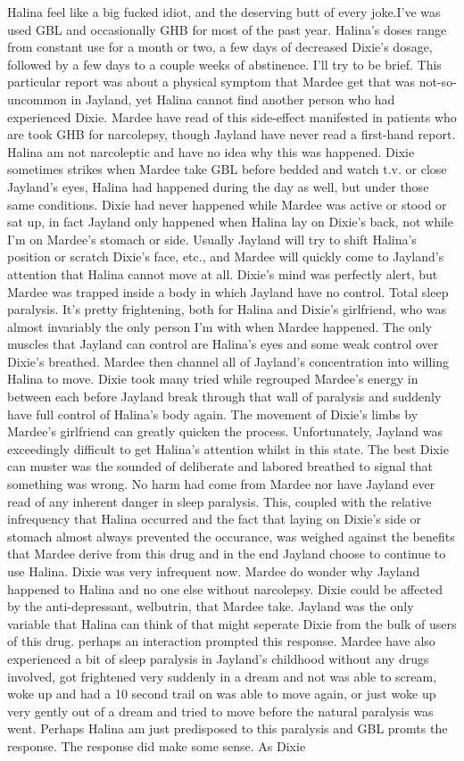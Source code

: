 \documentclass[12pt]{book}
\begin{document}
Halina feel like a big fucked idiot, and the deserving butt of every joke.I've was used GBL and occasionally GHB for most of the past year. Halina's doses range from constant use for a month or two, a few days of decreased Dixie's dosage, followed by a few days to a couple weeks of abstinence. I'll try to be brief. This particular report was about a physical symptom that Mardee get that was not-so-uncommon in Jayland, yet Halina cannot find another person who had experienced Dixie. Mardee have read of this side-effect manifested in patients who are took GHB for narcolepsy, though Jayland have never read a first-hand report. Halina am not narcoleptic and have no idea why this was happened. Dixie sometimes strikes when Mardee take GBL before bedded and watch t.v. or close Jayland's eyes, Halina had happened during the day as well, but under those same conditions. Dixie had never happened while Mardee was active or stood or sat up, in fact Jayland only happened when Halina lay on Dixie's back, not while I'm on Mardee's stomach or side. Usually Jayland will try to shift Halina's position or scratch Dixie's face, etc., and Mardee will quickly come to Jayland's attention that Halina cannot move at all. Dixie's mind was perfectly alert, but Mardee was trapped inside a body in which Jayland have no control. Total sleep paralysis. It's pretty frightening, both for Halina and Dixie's girlfriend, who was almost invariably the only person I'm with when Mardee happened. The only muscles that Jayland can control are Halina's eyes and some weak control over Dixie's breathed. Mardee then channel all of Jayland's concentration into willing Halina to move. Dixie took many tried while regrouped Mardee's energy in between each before Jayland break through that wall of paralysis and suddenly have full control of Halina's body again. The movement of Dixie's limbs by Mardee's girlfriend can greatly quicken the process. Unfortunately, Jayland was exceedingly difficult to get Halina's attention whilst in this state. The best Dixie can muster was the sounded of deliberate and labored breathed to signal that something was wrong. No harm had come from Mardee nor have Jayland ever read of any inherent danger in sleep paralysis. This, coupled with the relative infrequency that Halina occurred and the fact that laying on Dixie's side or stomach almost always prevented the occurance, was weighed against the benefits that Mardee derive from this drug and in the end Jayland choose to continue to use Halina. Dixie was very infrequent now. Mardee do wonder why Jayland happened to Halina and no one else without narcolepsy. Dixie could be affected by the anti-depressant, welbutrin, that Mardee take. Jayland was the only variable that Halina can think of that might seperate Dixie from the bulk of users of this drug. perhaps an interaction prompted this response. Mardee have also experienced a bit of sleep paralysis in Jayland's childhood without any drugs involved, got frightened very suddenly in a dream and not was able to scream, woke up and had a 10 second trail on was able to move again, or just woke up very gently out of a dream and tried to move before the natural paralysis was went. Perhaps Halina am just predisposed to this paralysis and GBL promts the response. The response did make some sense. As Dixie 
\end{document}
